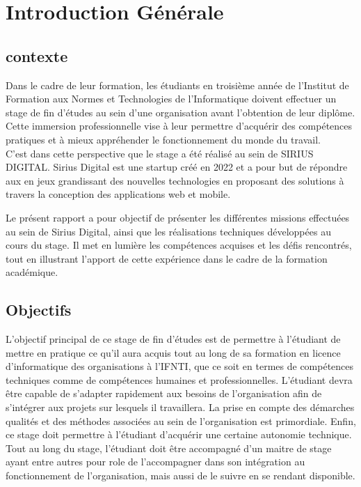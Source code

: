 \chapter*{Introduction Générale}
\thispagestyle{empty}
\clearpage
\section*{contexte}
\thispagestyle{empty}


Dans le cadre de leur formation, les étudiants en troisième année de l'Institut de Formation aux Normes et Technologies de l'Informatique doivent effectuer un stage de fin d’études au sein d’une organisation avant l’obtention de leur diplôme. Cette immersion professionnelle vise à leur permettre d’acquérir des compétences pratiques et à mieux appréhender le fonctionnement du monde du travail.\\

C’est dans cette perspective que le stage a été réalisé au sein de SIRIUS DIGITAL. Sirius Digital est une startup créé en 2022 et a pour but de répondre aux en jeux grandissant des nouvelles technologies en proposant des solutions à travers la conception des applications web et mobile.

Le présent rapport a pour objectif de présenter les différentes missions effectuées au sein de Sirius Digital, ainsi que les réalisations techniques développées au cours du stage. Il met en lumière les compétences acquises et les défis rencontrés, tout en illustrant l’apport de cette expérience dans le cadre de la formation académique.\\

\section*{Objectifs}

L’objectif principal de ce stage de fin d’études est de permettre à l’étudiant de mettre en pratique ce qu’il aura acquis tout au long de sa formation en licence d’informatique des organisations à l’\ac{IFNTI}, que ce soit en termes de compétences techniques comme de compétences humaines et professionnelles. L’étudiant devra être capable de s’adapter rapidement aux besoins de l’organisation afin de s’intégrer aux projets sur lesquels il travaillera. La prise en compte des démarches qualités et des méthodes associées au sein de l’organisation est primordiale. Enfin, ce stage doit permettre à l’étudiant d’acquérir une certaine autonomie technique.\\
Tout au long du stage, l’étudiant doit être accompagné d’un maitre de stage ayant entre autres pour role de l’accompagner dans son intégration au fonctionnement de l’organisation, mais aussi de le suivre en se rendant disponible.